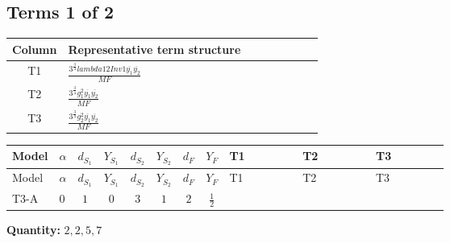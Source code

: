 \documentclass[8pt]{article}
\begin{document}
\begin{landscape}
\subsection*{Terms 1 of 2}
\begin{center}
\begin{tabular}{@{}c >{\raggedright\arraybackslash}p{0.82\linewidth}@{}}
\toprule
Column & Representative term structure \\
\midrule
T1 & \(\displaystyle \frac{3^{\frac{3}{4}} lambda12Inv1 \overline{y_{1}} \overline{y_{2}}}{MF}\) \\
\midrule
T2 & \(\displaystyle \frac{3^{\frac{3}{4}} g_{1}^{2} \overline{y_{1}} \overline{y_{2}}}{MF}\) \\
\midrule
T3 & \(\displaystyle \frac{3^{\frac{3}{4}} g_{2}^{2} \overline{y_{1}} \overline{y_{2}}}{MF}\) \\
\midrule
\bottomrule
\end{tabular}
\end{center}
\smallskip
\tiny
\begin{longtable}{@{}llcccccc >{\raggedright\arraybackslash}p{0.21\linewidth} >{\raggedright\arraybackslash}p{0.21\linewidth} >{\raggedright\arraybackslash}p{0.21\linewidth}@{}}
\toprule
Model & $\alpha$ & $d_{S_1}$ & $Y_{S_1}$ & $d_{S_2}$ & $Y_{S_2}$ & $d_F$ & $Y_F$ & T1 & T2 & T3 \\
\midrule
\endfirsthead
\toprule
Model & $\alpha$ & $d_{S_1}$ & $Y_{S_1}$ & $d_{S_2}$ & $Y_{S_2}$ & $d_F$ & $Y_F$ & T1 & T2 & T3 \\
\midrule
\endhead
T3-A & $0$ & $1$ & $0$ & $3$ & $1$ & $2$ & $\frac{1}{2}$ & \scriptsize\adjustbox{max width=\linewidth}{$\begin{gathered} \frac{3^{\frac{3}{4}} lambda12Inv1 \overline{y_{1}} \overline{y_{2}}}{6 MF}\end{gathered}$} & \scriptsize\adjustbox{max width=\linewidth}{$\begin{gathered} \frac{3^{\frac{3}{4}} g_{1}^{2} \overline{y_{1}} \overline{y_{2}}}{8 MF}\end{gathered}$} & \scriptsize\adjustbox{max width=\linewidth}{$\begin{gathered} \frac{17 \cdot 3^{\frac{3}{4}} g_{2}^{2} \overline{y_{1}} \overline{y_{2}}}{24 MF}\end{gathered}$} \\
\midrule
\bottomrule
\end{longtable}
\clearpage
\noindent\textbf{Quantity: }$\mathrm{2,2,5,7}$\par\smallskip

\end{landscape}
\end{document}
